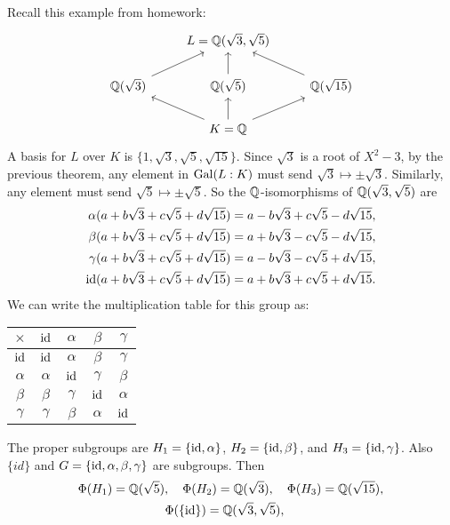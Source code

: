 \begin{example}
  Recall this example from homework:
  \[
  \begin{tikzcd}
    & L = \Q(\sqrt{3}, \sqrt{5}) \\
    \Q(\sqrt{3}) \urar & \Q(\sqrt{5}) \uar & \Q(\sqrt{15}) \ular \\
    & K = \Q \ular \uar \urar
  \end{tikzcd}
  \]
  A basis for $L$ over $K$ is $\{1, \sqrt{3}, \sqrt{5}, \sqrt{15}\}$.
  Since $\sqrt{3}$ is a root of $X^2 - 3$,
  by the previous theorem, any element in $\operatorname{Gal}(L : K)$
  must send $\sqrt{3} \mapsto \pm \sqrt{3}$. Similarly,
  any element must send
  $\sqrt{5} \mapsto \pm \sqrt{5}$. So
  the $\mathbb{Q}$-isomorphisms of $\mathbb{Q}(\sqrt{3}, \sqrt{5})$
  are
  \begin{align*}
    \alpha(a + b\sqrt{3} + c\sqrt{5} + d\sqrt{15})
    &= a - b\sqrt{3} + c\sqrt{5} - d\sqrt{15}, \\
    \beta(a + b\sqrt{3} + c\sqrt{5} + d\sqrt{15})
    &= a + b\sqrt{3} - c\sqrt{5} - d\sqrt{15}, \\
    \gamma(a + b\sqrt{3} + c\sqrt{5} + d\sqrt{15})
    &= a - b\sqrt{3} - c\sqrt{5} + d\sqrt{15}, \\
    \mathrm{id}(a + b\sqrt{3} + c\sqrt{5} + d\sqrt{15})
    &= a + b\sqrt{3} + c\sqrt{5} + d\sqrt{15}.
  \end{align*}
  We can write the multiplication table for this
  group as:
  \begin{center}
    \begin{tabular}{c|cccc}
      $\times$ & $\mathrm{id}$ & $\alpha$ & $\beta$ & $\gamma$ \\
      \hline
      $\mathrm{id}$ & $\mathrm{id}$ & $\alpha$ & $\beta$ & $\gamma$ \\
      $\alpha$ & $\alpha$ & $\mathrm{id}$ & $\gamma$ & $\beta$ \\
      $\beta$ & $\beta$ & $\gamma$ & $\mathrm{id}$ & $\alpha$ \\
      $\gamma$ & $\gamma$ & $\beta$ & $\alpha$ & $\mathrm{id}$
    \end{tabular}
  \end{center}
  The proper subgroups are
  $H_1 = \{\mathrm{id}, \alpha\}$, $H_2 = \{\mathrm{id}, \beta\}$, and
  $H_3 = \{\mathrm{id}, \gamma\}$. Also
  $\{id\}$ and $G = \{\mathrm{id}, \alpha, \beta, \gamma\}$
  are subgroups. Then
  \begin{gather*}
    \Phi(H_1) = \Q(\sqrt{5}), \quad
    \Phi(H_2) = \Q(\sqrt{3}), \quad
    \Phi(H_3) = \Q(\sqrt{15}), \\
    \Phi(\{\id\}) = \Q(\sqrt{3}, \sqrt{5}), \quad

\end{gather*}
\end{example}
